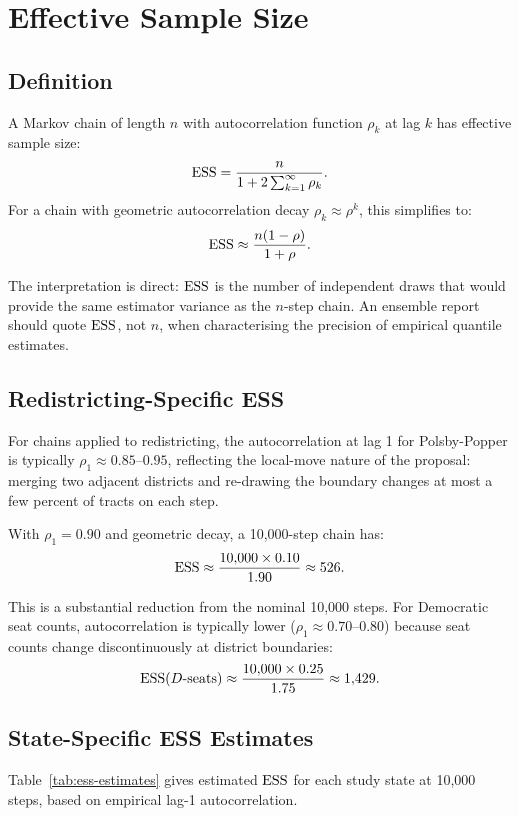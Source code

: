 \section{Effective Sample Size}
\label{sec:ess}

\subsection{Definition}

A Markov chain of length $n$ with autocorrelation function $\rho_k$ at lag $k$
has effective sample size:
\[
  \mathrm{ESS} = \frac{n}{1 + 2\sum_{k=1}^{\infty} \rho_k}.
\]
For a chain with geometric autocorrelation decay $\rho_k \approx \rho^k$,
this simplifies to:
\[
  \mathrm{ESS} \approx \frac{n(1 - \rho)}{1 + \rho}.
\]

The interpretation is direct: $\mathrm{ESS}$ is the number of independent draws
that would provide the same estimator variance as the $n$-step chain.
An ensemble report should quote $\mathrm{ESS}$, not $n$, when characterising
the precision of empirical quantile estimates.

\subsection{Redistricting-Specific ESS}

For \recom{} chains applied to redistricting, the autocorrelation
at lag 1 for Polsby-Popper is typically $\rho_1 \approx 0.85$--$0.95$,
reflecting the local-move nature of the proposal: merging two adjacent
districts and re-drawing the boundary changes at most a few percent of
tracts on each step.

With $\rho_1 = 0.90$ and geometric decay, a 10{,}000-step chain has:
\[
  \mathrm{ESS} \approx \frac{10{,}000 \times 0.10}{1.90} \approx 526.
\]

This is a substantial reduction from the nominal 10{,}000 steps.
For Democratic seat counts, autocorrelation is typically lower
($\rho_1 \approx 0.70$--$0.80$) because seat counts change
discontinuously at district boundaries:
\[
  \mathrm{ESS}(D\text{-seats}) \approx \frac{10{,}000 \times 0.25}{1.75} \approx 1{,}429.
\]

\subsection{State-Specific ESS Estimates}

Table~\ref{tab:ess-estimates} gives estimated $\mathrm{ESS}$ for each study state
at 10{,}000 steps, based on empirical lag-1 autocorrelation.

